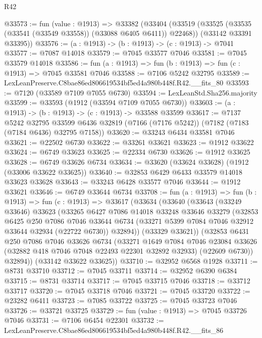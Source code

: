 \begin{lexlean}{R42}
\begin{coremodule}
{@33573 := fun (value : @1913) =>
  @33382
    (@33404
      (@33519 (@33525 (@33535 (@33541 (@33549 @33558)) (@33088 @6405 @6411)) @22468))
      (@33142 @33391 @33395))
@33576 := (a : @1913) -> (b : @1913) -> (c : @1913) -> @7041
@33577 := @7087 @14018
@33579 := @7045 @33577 @7046
@33581 := @7045 @33579 @14018
@33586 := fun (a : @1913) => fun (b : @1913) => fun (c : @1913) => @7045 @33581 @7046
@33588 := @7106 @5242 @32795
@33589 := LexLeanPreserve.C8bae86ed806619534bf5ed4a980b448f.R42.__fits_80
@33593 := @7120 (@33589 @7109 @7055 @6730)
@33594 := LexLeanStd.Sha256.majority
@33599 := @33593 (@1912 (@33594 @7109 @7055 @6730))
@33603 := (a : @1913) -> (b : @1913) -> (c : @1913) -> @33588 @33599
@33617 := @7137
    @5242
    @32795
    @33599
    @6436
    @32819
    (@7166 (@7176 @5242))
    (@7182 (@7183 (@7184 @6436) @32795 @7158))
@33620 := @33243 @6434 @33581 @7046
@33621 := @22502 @6730
@33622 := @33261 @33621
@33623 := @1912 @33622
@33624 := @6749 @33623
@33625 := @22334 @6730
@33626 := @1912 @33625
@33628 := @6749 @33626 @6734
@33634 := @33620 (@33624 @33628) (@1912 (@33006 @33622 @33625))
@33640 := @32853 @6429 @6433 @33579 @14018 @33623 @33628
@33643 := @33243 @6428 @33577 @7046
@33644 := @1912 @33621
@33646 := @6749 @33644 @6734
@33708 := fun (a : @1913) =>
  fun (b : @1913) =>
  fun (c : @1913) =>
  @33617
    (@33634
      (@33640
        (@33643
          (@33249 @33646)
          @33623
          (@33265
            @6427
            @7086
            @14018
            @33248
            @33646
            @33279
            (@32853
              @6425
              @250
              @7086
              @7046
              @33644
              @6734
              (@33271 @5399 @7084 @7046 @32912 @33644 @32934 (@22722 @6730))
              @32894))
          (@33329 @33621))
        (@32853
          @6431
          @250
          @7086
          @7046
          @33626
          @6734
          (@33271
            @1649
            @7084
            @7046
            @23084
            @33626
            (@32882 @418 @7046 @7048 @22493 @22301 @32892 @32933)
            (@22609 @6730))
          @32894))
      (@33142 @33622 @33625))
@33710 := @32952 @6568 @1928
@33711 := @8731 @33710
@33712 := @7045 @33711
@33714 := @32952 @6390 @6384
@33715 := @8731 @33714
@33717 := @7045 @33715 @7046
@33718 := @33712 @33717
@33720 := @7045 @33718 @7046
@33721 := @7045 @33720
@33722 := @23282 @6411
@33723 := @7085 @33722
@33725 := @7045 @33723 @7046
@33726 := @33721 @33725
@33729 := fun (value : @1913) => @7045 @33726 @7046
@33731 := @7106 @6454 @22301
@33732 := LexLeanPreserve.C8bae86ed806619534bf5ed4a980b448f.R42.__fits_86
}
\end{coremodule}
\end{lexlean}
